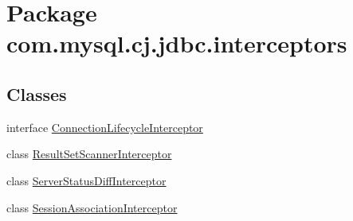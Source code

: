 \hypertarget{namespacecom_1_1mysql_1_1cj_1_1jdbc_1_1interceptors}{}\section{Package com.\+mysql.\+cj.\+jdbc.\+interceptors}
\label{namespacecom_1_1mysql_1_1cj_1_1jdbc_1_1interceptors}
\subsection*{Classes}
\begin{DoxyCompactItemize}
\item 
interface \mbox{\hyperlink{interfacecom_1_1mysql_1_1cj_1_1jdbc_1_1interceptors_1_1_connection_lifecycle_interceptor}{Connection\+Lifecycle\+Interceptor}}
\item 
class \mbox{\hyperlink{classcom_1_1mysql_1_1cj_1_1jdbc_1_1interceptors_1_1_result_set_scanner_interceptor}{Result\+Set\+Scanner\+Interceptor}}
\item 
class \mbox{\hyperlink{classcom_1_1mysql_1_1cj_1_1jdbc_1_1interceptors_1_1_server_status_diff_interceptor}{Server\+Status\+Diff\+Interceptor}}
\item 
class \mbox{\hyperlink{classcom_1_1mysql_1_1cj_1_1jdbc_1_1interceptors_1_1_session_association_interceptor}{Session\+Association\+Interceptor}}
\end{DoxyCompactItemize}
